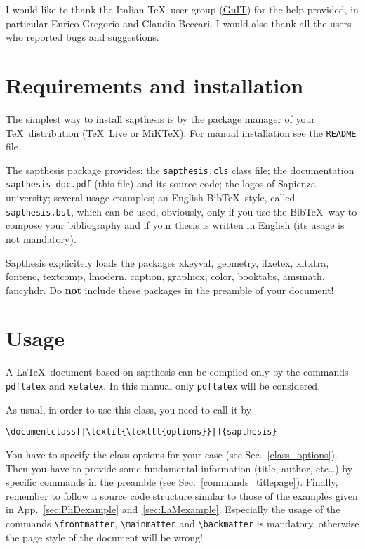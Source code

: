 \documentclass[a5paper,11pt]{article}
\newcommand{\bs}{\textbackslash}
\begin{document}
I would like to thank the Italian \TeX\ user group (\href{http://www.guitex.org/}{GuIT}) for the help provided, in particular Enrico Gregorio and Claudio Beccari. I would also thank all the users who reported bugs and suggestions.

\section[Requirements\\ and installation]{Requirements and installation}
\label{requirements_installation}

The simplest way to install \textsf{sapthesis} is by the package manager of 
your \TeX\ distribution (\TeX\ Live or MiK\TeX). For manual installation see 
the \texttt{README} file. 

The \textsf{sapthesis} package provides: the 
\texttt{sapthesis.cls} class file; the documentation 
\texttt{sapthesis-doc.pdf} (this file) and its source code; the logos of 
Sapienza university; several usage examples; an English Bib\TeX\ style, called 
\texttt{sapthesis.bst}, which can be used, obviously, only if you use the 
Bib\TeX\ way to compose your bibliography and if your thesis is written in 
English (its usage is not mandatory).


\textsf{Sapthesis} explicitely loads the packages \textsf{xkeyval}, \textsf{geometry}, \textsf{ifxetex}, \textsf{xltxtra}, \textsf{fontenc}, \textsf{textcomp}, \textsf{lmodern}, \textsf{caption}, \textsf{graphicx}, \textsf{color}, \textsf{booktabs}, \textsf{amsmath}, \textsf{fancyhdr}.
Do \textbf{not} include these packages in the preamble of your document!





\section{Usage}

A \LaTeX\ document based on \textsf{sapthesis} can be compiled only by the commands
\texttt{pdflatex} and \texttt{xelatex}. In this manual only \texttt{pdflatex} will be considered.


As usual, in order to use this class, you need to call it by
\begin{lstlisting}
\documentclass[|\textit{\texttt{options}}|]{sapthesis}
\end{lstlisting}
You have to specify the class options for your case (see Sec.~\ref{class_options}). Then you have to provide some fundamental information (title, author, etc\ldots) by specific commands in the preamble (see Sec.~\ref{commands_titlepage}). Finally, remember to follow a source code structure similar to those of the examples given in App.~\ref{sec:PhDexample} and~\ref{sec:LaMexample}.
Especially the usage of the commands \texttt{\bs frontmatter}, \texttt{\bs mainmatter} and \texttt{\bs backmatter} is mandatory, otherwise the page style of the document will be wrong!
\end{document}
